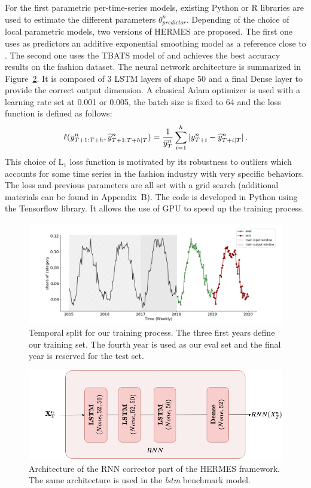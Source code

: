 \documentclass[review]{elsarticle}
\newcommand{\ts}{y}
\newcommand{\tspred}{\widehat{\ts}}
\newcommand{\statparam}{\theta_{predictor}}
\newcommand{\lag}{h}
\newcommand{\meants}{\Bar{\ts}}
\begin{document}
For the first parametric per-time-series models, existing Python or R libraries are used to estimate the different parameters $\statparam^n$.  Depending of the choice of local parametric models, two versions of HERMES are proposed. The first one uses as predictors an additive exponential smoothing model as a reference close to \cite{smyl2020hybrid}. The second one uses the TBATS model of \cite{doi:10.1198/jasa.2011.tm09771} and  achieves the best accuracy results on the fashion dataset. The neural network architecture is summarized in Figure~\ref{fig:rnn_architecture}. It is composed of 3 LSTM layers of shape 50 and a final Dense layer to provide the correct output dimension. A classical Adam optimizer is used with a learning rate set at 0.001 or 0.005, the batch size is fixed to 64 and the loss function is defined as follows:
$$
\ell(\ts^n_{T+1:T+\lag},\tspred^n_{T+1:T+\lag|T}) = \frac{1}{\meants^n_T}\sum_{i=1}^{\lag}|\ts^n_{T+i} - \tspred^n_{T+i|T}|\,.
$$
This choice of $\mathrm{L}_1$  loss function is motivated by its robustness to outliers which accounts for some time series in the fashion industry with very specific behaviors. The loss and previous parameters are all set with a grid search (additional materials can be found in Appendix~B). The code is developed in Python using the Tensorflow library. It allows the use of GPU to speed up the training process.



\begin{figure}
  \centering
    \includegraphics[width=1.\linewidth]{figure/train_eval_test_set}
  \caption{Temporal split for our training process. The three first years define our training set. The fourth year is used as our eval set and the final year is reserved for the test set.}
\label{fig:train_eval_test_set}
\end{figure}

\begin{figure}
  \centering
    \includegraphics[width=0.8\linewidth]{figure/lstm_archi}
  \caption{Architecture of the RNN corrector part of the HERMES framework. The same architecture is used in the \textit{lstm} benchmark model.}
\label{fig:rnn_architecture}
\end{figure}
\end{document}
